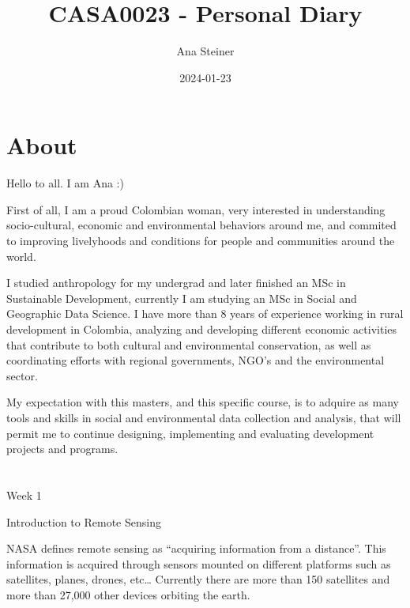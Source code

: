 \documentclass[
  letterpaper,
  DIV=11,
  numbers=noendperiod]{scrreprt}
\title{CASA0023 - Personal Diary}
\author{Ana Steiner}
\date{2024-01-23}
\renewcommand*\contentsname{Table of contents}
\newcommand\contentsname{Table of contents}
\begin{document}
\maketitle
\ifdefined\Shaded\renewenvironment{Shaded}{\begin{tcolorbox}[interior hidden, enhanced, boxrule=0pt, borderline west={3pt}{0pt}{shadecolor}, frame hidden, sharp corners, breakable]}{\end{tcolorbox}}\fi

\renewcommand*\contentsname{Table of contents}
{
\hypersetup{linkcolor=}
\setcounter{tocdepth}{2}
\tableofcontents
}

\hypertarget{about}{%
\chapter{About}\label{about}}

Hello to all. I am Ana :)

First of all, I am a proud Colombian woman, very interested in
understanding socio-cultural, economic and environmental behaviors
around me, and commited to improving livelyhoods and conditions for
people and communities around the world.

I studied anthropology for my undergrad and later finished an MSc in
Sustainable Development, currently I am studying an MSc in Social and
Geographic Data Science. I have more than 8 years of experience working
in rural development in Colombia, analyzing and developing different
economic activities that contribute to both cultural and environmental
conservation, as well as coordinating efforts with regional governments,
NGO's and the environmental sector.

My expectation with this masters, and this specific course, is to
adquire as many tools and skills in social and environmental data
collection and analysis, that will permit me to continue designing,
implementing and evaluating development projects and programs.


\hypertarget{section}{%
\chapter{}\label{section}}

Week 1

Introduction to Remote Sensing

NASA defines remote sensing as ``acquiring information from a
distance''. This information is acquired through sensors mounted on
different platforms such as satellites, planes, drones, etc\ldots{}
Currently there are more than 150 satellites and more than 27,000 other
devices orbiting the earth.
\end{document}

